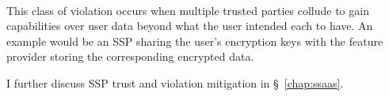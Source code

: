 \begin{packed_desc}
\item[Colluding (L):] \hfill \\
  This class of violation occurs when multiple trusted parties collude
  to gain capabilities over user data beyond what the user intended
  each to have. An example would be an SSP sharing the user's
  encryption keys with the feature provider storing the corresponding
  encrypted data.
\end{packed_desc}

I further discuss SSP trust and violation mitigation in
\S~\ref{chap:ssaas}.
